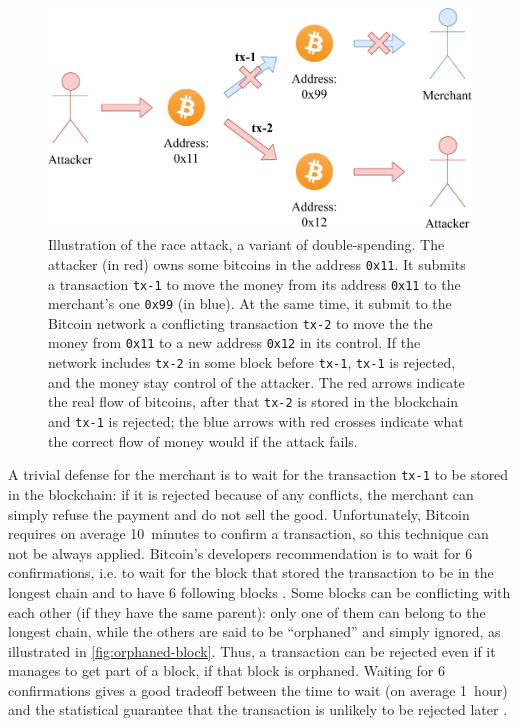 \begin{figure}[t]
	\centering
	\vspace*{0.25cm}
	\includegraphics[scale=0.75]{figures/race_attack_3}
	\vspace*{0.25cm}
	\caption[Illustration of the race attack]{
		Illustration of the race attack, a variant of double-spending.
		The attacker (in red) owns some bitcoins in the address \texttt{0x11}.
		It submits a transaction \texttt{tx-1} to move the money from its address \texttt{0x11} to the merchant's one \texttt{0x99} (in blue).
		At the same time, it submit to the Bitcoin network a conflicting transaction \texttt{tx-2} to move the the money from \texttt{0x11} to a new address \texttt{0x12} in its control.
		If the network includes \texttt{tx-2} in some block before \texttt{tx-1}, \texttt{tx-1} is rejected, and the money stay control of the attacker.
		The red arrows indicate the real flow of bitcoins, after that \texttt{tx-2} is stored in the blockchain and \texttt{tx-1} is rejected;
		the blue arrows with red crosses indicate what the correct flow of money would if the attack fails.
	}
	\label{fig:race-attack}
\end{figure}

A trivial defense for the merchant is to wait for the transaction \texttt{tx-1} to be stored in the blockchain:
if it is rejected because of any conflicts, the merchant can simply refuse the payment and do not sell the good.
Unfortunately, Bitcoin requires on average \SI{10}{minutes} to confirm a transaction, so this technique can not be always applied.
Bitcoin's developers recommendation is to wait for \num{6} confirmations, i.e. to wait for the block that stored the transaction to be in the longest chain and to have \num{6} following blocks \cite{confirmation}.
Some blocks can be conflicting with each other (if they have the same parent):
only one of them can belong to the longest chain, while the others are said to be ``orphaned'' \cite{orphaned_block} and simply ignored, as illustrated in \cref{fig:orphaned-block}.
Thus, a transaction can be rejected even if it manages to get part of a block, if that block is orphaned.
Waiting for \num{6} confirmations gives a good tradeoff between the time to wait (on average \SI{1}{hour}) and the statistical guarantee that the transaction is unlikely to be rejected later \cite{bitcoin_2009}.


